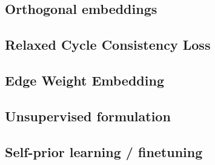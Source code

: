 \documentclass[10pt, twocolumn, a4paper]{article}
\theoremstyle{definition}
\begin{document}
\subsection{Orthogonal embeddings} \label{sec:ortho_emb}

\subsection{Relaxed Cycle Consistency Loss}

\subsection{Edge Weight Embedding}

\subsection{Unsupervised formulation}

\subsection{Self-prior learning / finetuning}



\end{document}
